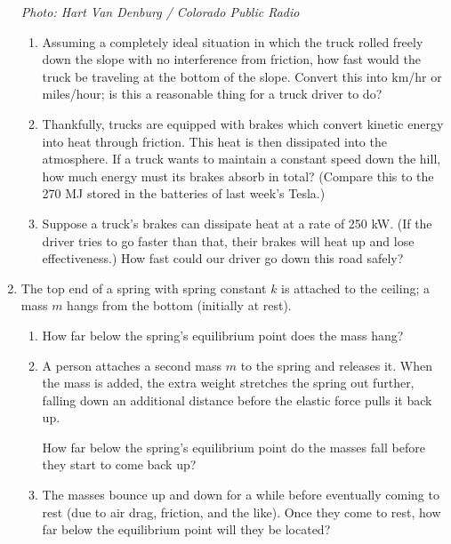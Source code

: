 \documentclass[12pt]{article}
\begin{document}
\begin{enumerate}
\begin{minipage}{4in}
\begin{center}
\tiny \it Photo: Hart Van Denburg / Colorado Public Radio

\end{center}
\end{minipage}
\medskip



\begin{enumerate}
	\item Assuming a completely ideal situation in which the truck rolled freely down the slope with no interference from friction, how fast would the truck be traveling at the bottom of the slope. Convert this into km/hr or miles/hour; is this a reasonable thing for a truck driver to do?
	
	\item Thankfully, trucks are equipped with brakes which convert kinetic energy into heat through friction. This heat is then dissipated into the atmosphere. If a truck wants to maintain a constant speed down the hill, how much energy must its brakes absorb in total? (Compare this to the 270 MJ stored in the batteries of last week's Tesla.)
	
	\item Suppose a truck's brakes can dissipate heat at a rate of 250 kW. (If the driver tries to go faster than that, their brakes will heat up and lose effectiveness.) How fast could our driver go down this road safely? 
	
\end{enumerate}

\newpage


\item The top end of a spring with spring constant $k$ is attached to the ceiling; a mass $m$ hangs from the bottom (initially at rest). 

\begin{enumerate}
	\item How far below the spring's equilibrium point does the mass hang?
	\item A person attaches a second mass $m$ to the spring and releases it. When the mass is added, the extra weight stretches the spring out further,
	falling down an additional distance before the elastic force pulls it back up.
	
How far below the spring's equilibrium point do the masses fall before they start to come back up?

\item The masses bounce up and down for a while before eventually
coming to rest (due to air drag, friction, and the like).
Once they come to rest, how far below the equilibrium point
will they be located?
\end{enumerate}


\end{enumerate}
\end{document}
